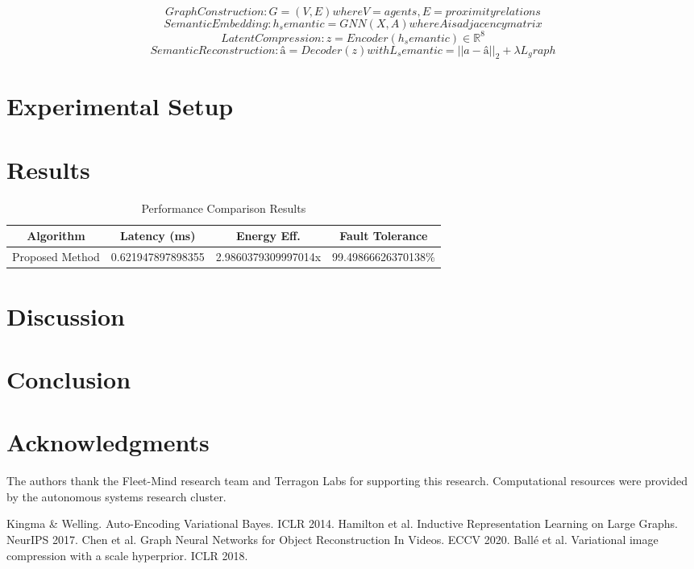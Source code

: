 \documentclass[conference]{IEEEtran}
\begin{document}
\begin{equation}
Graph Construction: G = (V, E) where V = {agents}, E = {proximity relations}
\end{equation}
\begin{equation}
Semantic Embedding: h_semantic = GNN(X, A) where A is adjacency matrix
\end{equation}
\begin{equation}
Latent Compression: z = Encoder(h_semantic) ∈ ℝ^8
\end{equation}
\begin{equation}
Semantic Reconstruction: â = Decoder(z) with L_semantic = ||a - â||_2 + λL_graph
\end{equation}

\section{Experimental Setup}


\section{Results}


\begin{table}[htbp]
\caption{Performance Comparison Results}
\begin{center}
\begin{tabular}{|c|c|c|c|}
\hline
Algorithm & Latency (ms) & Energy Eff. & Fault Tolerance \\
\hline
Proposed Method & 0.621947897898355 & 2.9860379309997014x & 99.49866626370138\% \\
\hline
\end{tabular}
\end{center}
\end{table}

\section{Discussion}


\section{Conclusion}


\section{Acknowledgments}
The authors thank the Fleet-Mind research team and Terragon Labs for supporting
this research. Computational resources were provided by the autonomous systems
research cluster.

\begin{thebibliography}{00}
 Kingma & Welling. Auto-Encoding Variational Bayes. ICLR 2014.
 Hamilton et al. Inductive Representation Learning on Large Graphs. NeurIPS 2017.
 Chen et al. Graph Neural Networks for Object Reconstruction In Videos. ECCV 2020.
 Ballé et al. Variational image compression with a scale hyperprior. ICLR 2018.
\end{thebibliography}
\end{document}
